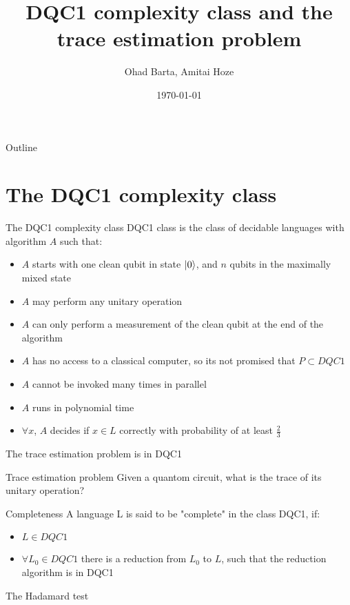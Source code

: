 \documentclass[leqno,fleqn]{beamer}
\author{Ohad Barta, Amitai Hoze}
\date{\today}
\title{DQC1 complexity class and the trace estimation problem}
\begin{document}
\maketitle
\begin{frame}{Outline}
\tableofcontents
\end{frame}


\section{The DQC1 complexity class}
\label{sec-1}
\begin{frame}[label=sec-1-1]{The DQC1 complexity class}
DQC1 class is the class of decidable languages with algorithm \(A\) such that:

\begin{itemize}
\item \(A\) starts with one clean qubit in state \(\ket{0}\), and \(n\) qubits in
the maximally mixed state
\item \(A\) may perform any unitary operation
\item \(A\) can only perform a measurement of the clean qubit at the end of
the algorithm
\item \(A\) has no access to a classical computer, so its not promised that
\(P \subset DQC1\)
\item \(A\) cannot be invoked many times in parallel
\item \(A\) runs in polynomial time
\item \(\forall x\), \(A\) decides if \(x \in L\) correctly with probability of
at least \(\frac{2}{3}\)
\end{itemize}
\end{frame}
\begin{frame}[label=sec-1-2]{The trace estimation problem is in DQC1}
\begin{block}{Trace estimation problem}
Given a quantom circuit, what is the trace of its unitary operation?
\end{block}
\begin{block}{Completeness}
A language L is said to be "complete" in the class DQC1, if:
\begin{itemize}
\item \(L \in DQC1\)
\item \(\forall L_{0} \in DQC1\) there is a reduction from \(L_{0}\) to \(L\), such that the reduction algorithm is in DQC1
\end{itemize}
\end{block}
\end{frame}
\begin{frame}[label=sec-1-3]{The Hadamard test}
\end{frame}
\end{document}
